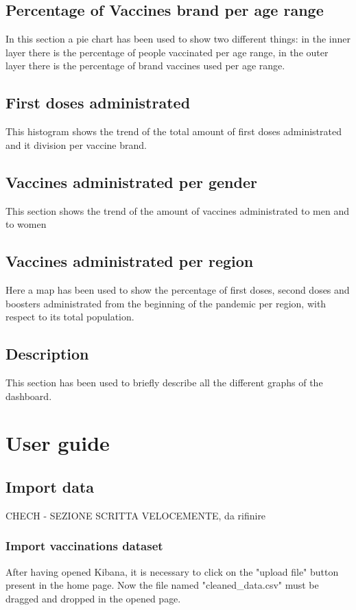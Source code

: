 \documentclass{article}
\begin{document}
\subsection{Percentage of Vaccines brand per age range}
In this section a pie chart has been used to show two different things: in the inner layer there is the percentage of people vaccinated per age range, in the outer layer there is the percentage of brand vaccines used per age range.

\subsection{First doses administrated}
This histogram shows the trend of the total amount of first doses administrated and it division per vaccine brand.

\subsection{Vaccines administrated per gender}
This section shows the trend of the amount of vaccines administrated to men and to women 

\subsection{Vaccines administrated per region}
Here a map has been used to show the percentage of first doses, second doses and boosters administrated from the beginning of the pandemic per region, with respect to its total population.

\subsection{Description}
This section has been used to briefly describe all the different graphs of the dashboard.

\newpage

\section{User guide}

\subsection{Import data}
CHECH - SEZIONE SCRITTA VELOCEMENTE, da rifinire
\subsubsection{Import vaccinations dataset}
After having opened Kibana, it is necessary to click on the {\selectfont"upload file"} button present in the home page. Now the file named {\selectfont"cleaned\_data.csv"} must be dragged and dropped in the opened page.
\end{document}
